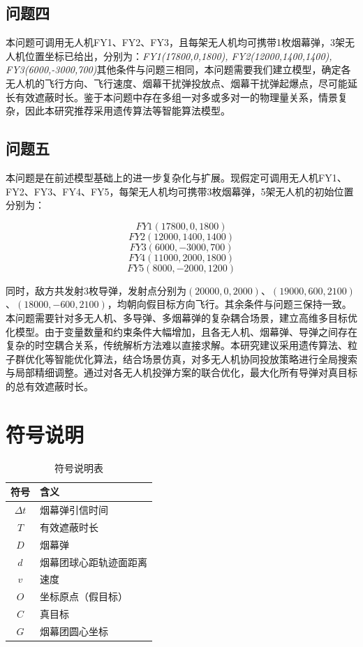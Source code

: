 \documentclass{article}
\begin{document}
\subsection{问题四}

本问题可调用无人机FY1、FY2、FY3，且每架无人机均可携带1枚烟幕弹，3架无人机位置坐标已给出，分别为：\textit{FY1(17800,0,1800), FY2(12000,1400,1400), FY3(6000,-3000,700)}其他条件与问题三相同，本问题需要我们建立模型，确定各无人机的飞行方向、飞行速度、烟幕干扰弹投放点、烟幕干扰弹起爆点，尽可能延长有效遮蔽时长。鉴于本问题中存在多组一对多或多对一的物理量关系，情景复杂，因此本研究推荐采用遗传算法等智能算法模型。
\subsection{问题五}
本问题是在前述模型基础上的进一步复杂化与扩展。现假定可调用无人机FY1、FY2、FY3、FY4、FY5，每架无人机均可携带3枚烟幕弹，5架无人机的初始位置分别为：

$$FY1(17800, 0, 1800)$$
$$FY2(12000, 1400, 1400)$$
$$FY3(6000, -3000, 700)$$
$$FY4(11000, 2000, 1800)$$
$$FY5(8000, -2000, 1200)$$

同时，敌方共发射3枚导弹，发射点分别为$(20000,0,2000)$、$(19000,600,2100)$、$(18000,-600,2100)$，均朝向假目标方向飞行。其余条件与问题三保持一致。
本问题需要针对多无人机、多导弹、多烟幕弹的复杂耦合场景，建立高维多目标优化模型。由于变量数量和约束条件大幅增加，且各无人机、烟幕弹、导弹之间存在复杂的时空耦合关系，传统解析方法难以直接求解。本研究建议采用遗传算法、粒子群优化等智能优化算法，结合场景仿真，对多无人机协同投放策略进行全局搜索与局部精细调整。通过对各无人机投弹方案的联合优化，最大化所有导弹对真目标的总有效遮蔽时长。
\section{符号说明}
\begin{table}[H]
\centering
\caption{符号说明表}
\begin{tabular}{|c|l|}
\hline
符号 & 含义 \\
\hline
$\Delta t$ & 烟幕弹引信时间 \\
$T$ & 有效遮蔽时长 \\
$D$ & 烟幕弹 \\
$d$ & 烟幕团球心距轨迹面距离 \\
$v$ & 速度 \\
$O$ & 坐标原点（假目标） \\
$C$ & 真目标 \\
$G$ & 烟幕团圆心坐标 \\
\hline
\end{tabular}
\end{table}
\end{document}
